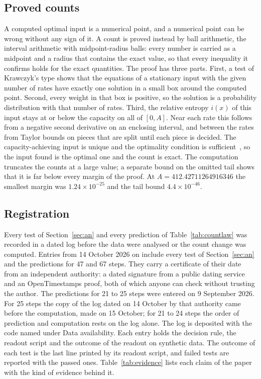 \subsection{Proved counts}\label{sec:certmeth}
A computed optimal input is a numerical point, and a numerical point can be wrong without any sign of it. A count is proved instead
by ball arithmetic, the interval arithmetic with midpoint-radius balls: every number is carried as a midpoint and a radius
that contains the exact value, so that every
inequality it confirms holds for the exact quantities. The proof has three parts. First, a test of Krawczyk's type shows that the
equations of a stationary input with the given number of rates have exactly one solution in a small box around the computed point.
Second, every weight in that box is positive, so the solution is a probability distribution with that number of rates. Third, the
relative entropy $i(x)$ of this input stays at or below the capacity on all of $[0,A]$. Near each rate this follows from a negative
second derivative on an enclosing interval, and between the rates from Taylor bounds on pieces that are split until each piece is
decided. The capacity-achieving input is unique and the optimality condition is sufficient~\cite{Shamai1990}, so the input found
is the optimal one and the count is exact. The computation truncates the counts at a large value; a separate bound on the omitted
tail shows that it is far below every margin of the proof. At $A=412.42711264916346$ the smallest margin was $1.24\times10^{-25}$
and the tail bound $4.4\times10^{-46}$.

\subsection{Registration}
Every test of Section~\ref{sec:an} and every prediction of Table~\ref{tab:countlaw} was recorded in a dated log before the data were analysed or the count change was
computed. Entries from 14 October 2026 on include every test of Section~\ref{sec:an} and the predictions for 47 and 67 steps. They
carry a certificate of their date from an independent authority: a dated signature from a public dating service and an
OpenTimestamps proof, both of which anyone can check without trusting the author. The predictions for 21 to 25 steps were entered on
9 September 2026. For 25 steps the copy of the log dated on 14 October by that authority came before the computation, made on 15
October; for 21 to 24 steps the
order of prediction and computation rests on the log alone. The log is deposited with the code named under Data availability. Each entry holds the decision rule, the readout script and the outcome of the readout on synthetic data. The outcome of each test is the last line printed by its readout script, and failed tests are reported with the passed ones. Table~\ref{tab:evidence} lists each claim of the paper with the kind of evidence
behind it.

